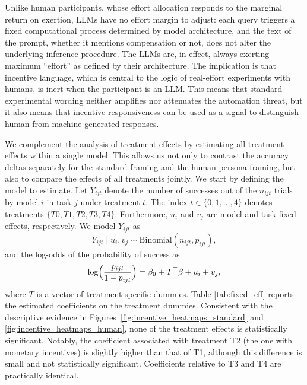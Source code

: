 \documentclass[12pt,a4paper]{article}
\begin{document}
Unlike human participants, whose effort allocation responds to the marginal return on exertion, LLMs have no effort margin to adjust: each query triggers a fixed computational process determined by model architecture, and the text of the prompt, whether it mentions compensation or not, does not alter the underlying inference procedure. The LLMs are, in effect, always exerting maximum ``effort'' as defined by their architecture. The implication is that incentive language, which is central to the logic of real-effort experiments with humans, is inert when the participant is an LLM. This means that standard experimental wording neither amplifies nor attenuates the automation threat, but it also means that incentive responsiveness
can be
used as a signal to distinguish human from machine-generated responses.



We complement the analysis of treatment effects by estimating all treatment effects within a single model. 
This allows us not only to contrast the accuracy deltas separately for the standard framing and the human-persona framing, but also to compare the effects of all treatments jointly.
We start by defining the model to estimate. Let $Y_{ijt}$ denote the number of successes out of the $n_{ijt}$ trials by model $i$ in task $j$ under treatment $t$. The index $t \in \{0, 1, \dots, 4\}$ denotes treatments $\{T0, T1, T2, T3, T4\}$. Furthermore, $u_i$ and $v_j$ are model and task fixed effects, respectively. 
We model $Y_{ijt}$ as
\begin{equation}\label{eq:fixed_eff}
	Y_{ijt} \mid u_i, v_j \sim \text{Binomial}(n_{ijt}, p_{ijt}),
\end{equation}
and the log-odds of the probability of success as
\begin{equation}\label{eq:fixed_eff_logit}
	\log\Bigl(\frac{p_{ijt}}{1-p_{ijt}}\Bigr) = \beta_0 + T^\top\beta + u_i + v_j,
\end{equation}
where $T$ is a vector of treatment-specific dummies. Table \ref{tab:fixed_eff} reports the estimated coefficients on the treatment dummies. 
Consistent with the descriptive evidence in Figures~\ref{fig:incentive_heatmaps_standard} and \ref{fig:incentive_heatmaps_human}, none of the treatment effects is statistically significant.
Notably, the coefficient associated with treatment T2 (the one with monetary incentives) is slightly higher than that of T1, although this difference is small and not statistically significant. Coefficients relative to T3 and T4 are practically identical.
\end{document}
